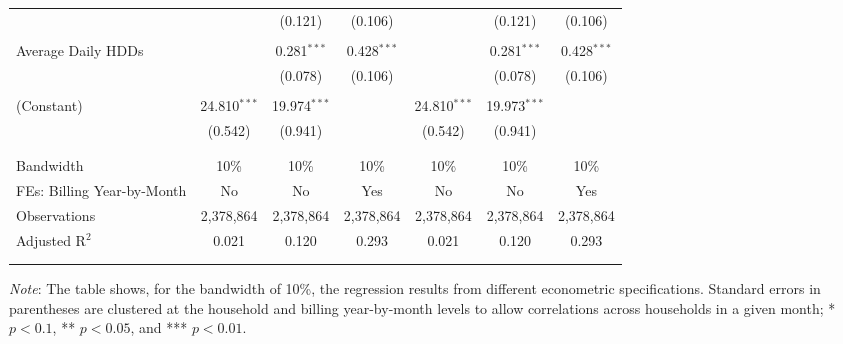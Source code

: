 {\begin{table}[t!]
\begin{adjustbox}{scale = 0.87}
\begin{threeparttable}
\begin{tabular}{@{\extracolsep{10pt}}lcccccc}
                    &  & (0.121) & (0.106) &  & (0.121) & (0.106) \\ 
                    & & & & & & \\ 
                    Average Daily HDDs &  & 0.281$^{***}$ & 0.428$^{***}$ &  & 0.281$^{***}$ & 0.428$^{***}$ \\ 
                    &  & (0.078) & (0.106) &  & (0.078) & (0.106) \\ 
                    & & & & & & \\ 
                    (Constant) & 24.810$^{***}$ & 19.974$^{***}$ &  & 24.810$^{***}$ & 19.973$^{***}$ &  \\ 
                    & (0.542) & (0.941) &  & (0.542) & (0.941) &  \\ 
                    & & & & & & \\
                    \hline
                    \\[-2.0ex]
                    Bandwidth & 10\% & 10\% & 10\% & 10\% & 10\% & 10\% \\ 
                    FEs: Billing Year-by-Month & No & No & Yes & No & No & Yes \\ 
                    Observations & 2,378,864 & 2,378,864 & 2,378,864 & 2,378,864 & 2,378,864 & 2,378,864 \\ 
                    Adjusted R$^{2}$ & 0.021 & 0.120 & 0.293 & 0.021 & 0.120 & 0.293 \\
                    \\[-2.0ex]
                    \hline \hline
                    \\[-4.5ex]
                \end{tabular}
                \begin{tablenotes}[flushleft]
                    \footnotesize
                    \item \textit{Note}: The table shows, for the bandwidth of 10\%, the regression results from different econometric specifications. Standard errors in parentheses are clustered at the household and billing year-by-month levels to allow correlations across households in a given month; * $p < 0.1$, ** $p < 0.05$, and *** $p < 0.01$.
                \end{tablenotes}
            \end{threeparttable}
        \end{adjustbox}
    \end{table}
}
